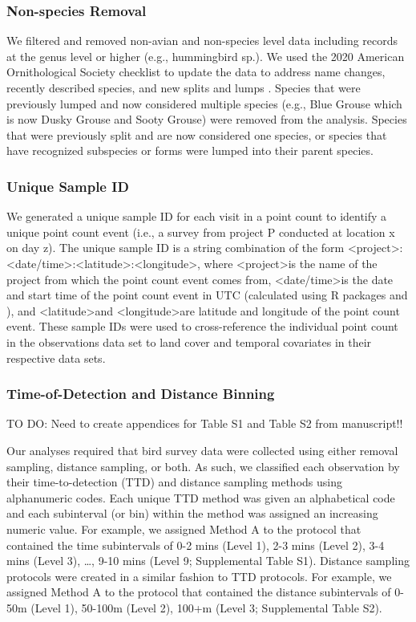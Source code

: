 \subsubsection{Non-species Removal}
We filtered and removed non-avian and non-species level data including records at the genus level or higher (e.g., hummingbird sp.). We used the 2020 American Ornithological Society checklist to update the data to address name changes, recently described species, and new splits and lumps \citep{chesser_sixty-first_2020}. Species that were previously lumped and now considered multiple species (e.g., Blue Grouse which is now Dusky Grouse and Sooty Grouse) were removed from the analysis. Species that were previously split and are now considered one species, or species that have recognized subspecies or forms were lumped into their parent species. 

\subsubsection{Unique Sample ID}
We generated a unique sample ID for each visit in a point count to identify a unique point count event (i.e., a survey from project P conducted at location x on day z). The unique sample ID is a string combination of the form \textless project\textgreater:\textless date/time\textgreater:\textless latitude\textgreater:\textless longitude\textgreater, where \textless project\textgreater is the name of the project from which the point count event comes from, \textless date/time\textgreater is the date and start time of the point count event in UTC (calculated using R packages \citep{teucher_lutz_2019} and \citep{urbanek_proj4_2020}), and \textless latitude\textgreater and \textless longitude\textgreater are latitude and longitude of the point count event. These sample IDs were used to cross-reference the individual point count in the observations data set to land cover and temporal covariates in their respective data sets.

\subsubsection{Time-of-Detection and Distance Binning}
TO DO: Need to create appendices for Table S1 and Table S2 from manuscript!!

Our analyses required that bird survey data were collected using either removal sampling, distance sampling, or both. As such, we classified each observation by their time-to-detection (TTD) and distance sampling methods using alphanumeric codes. Each unique TTD method was given an alphabetical code and each subinterval (or bin) within the method was assigned an increasing numeric value. For example, we assigned Method A to the protocol that contained the time subintervals of 0-2 mins (Level 1), 2-3 mins (Level 2), 3-4 mins (Level 3), …, 9-10 mins (Level 9; Supplemental Table S1). Distance sampling protocols were created in a similar fashion to TTD protocols. For example, we assigned Method A to the protocol that contained the distance subintervals of 0-50m (Level 1), 50-100m (Level 2), 100+m (Level 3; Supplemental Table S2).

